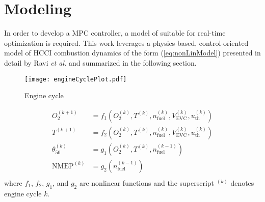 \section{Modeling} \label{sec:modeling}
In order to develop a MPC controller, a model of suitable for real-time optimization is required. This work leverages a physics-based, control-oriented model of HCCI combustion dynamics of the form (\ref{eq:nonLinModel}) presented in detail by Ravi \textit{et al.} \cite{Ravi2012} and summarized in the following section.
\begin{figure}
\centering
\texttt{[image: engineCyclePlot.pdf]}
\caption{Engine cycle}
\label{fig:engineCycle}
\end{figure}

\begin{equation}
\begin{aligned}
O_2^{(k+1)} &= f_{1}^{}(O_{2}^{(k)},T^{(k)},n_{\mathrm{fuel}}^{(k)},V_{\mathrm{EVC}}^{(k)},u_{\mathrm{th}}^{(k)})\\
T^{(k+1)} &= f_{2}^{}(O_2^{(k)},T^{(k)},n_{\mathrm{fuel}}^{(k)},V_{\mathrm{EVC}}^{(k)},u_{\mathrm{th}}^{(k)})\\
\theta_{50}^{(k)} &= g_{1}^{}(O_{2}^{(k)},T^{(k)},n_{\mathrm{fuel}}^{(k-1)})\\
\mathrm{NMEP}^{(k)} &= g_{2}^{}(n_{\mathrm{fuel}}^{(k-1)})\label{eq:nonLinModel}\\
\end{aligned}
\end{equation}
where $f_1$, $f_2$, $g_1$, and $g_2$ are nonlinear functions and the superscript $^{(k)}$ denotes engine cycle $k$.

